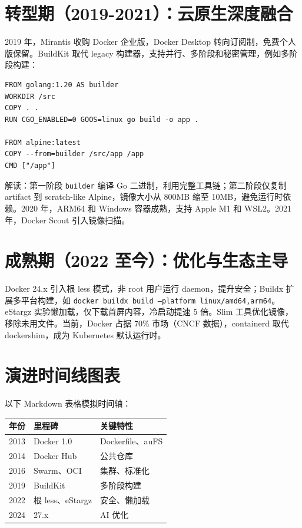 \section{转型期（2019-2021）：云原生深度融合}
2019 年，Mirantis 收购 Docker 企业版，Docker Desktop 转向订阅制，免费个人版保留。BuildKit 取代 legacy 构建器，支持并行、多阶段和秘密管理，例如多阶段构建：\par
\begin{lstlisting}
FROM golang:1.20 AS builder
WORKDIR /src
COPY . .
RUN CGO_ENABLED=0 GOOS=linux go build -o app .

FROM alpine:latest
COPY --from=builder /src/app /app
CMD ["/app"]
\end{lstlisting}
解读：第一阶段 \texttt{builder} 编译 Go 二进制，利用完整工具链；第二阶段仅复制 artifact 到 scratch-like Alpine，镜像大小从 800MB 缩至 10MB，避免运行时依赖。2020 年，ARM64 和 Windows 容器成熟，支持 Apple M1 和 WSL2。2021 年，Docker Scout 引入镜像扫描。\par
\section{成熟期（2022 至今）：优化与生态主导}
Docker 24.x 引入根 less 模式，非 root 用户运行 daemon，提升安全；Buildx 扩展多平台构建，如 \texttt{docker buildx build --platform linux/amd64,arm64}。eStargz 实验懒加载，仅下载首屏内容，冷启动提速 5 倍。Slim 工具优化镜像，移除未用文件。当前，Docker 占据 70\%{} 市场（CNCF 数据），containerd 取代 dockershim，成为 Kubernetes 默认运行时。\par
\section{演进时间线图表}
以下 Markdown 表格模拟时间轴：\par
\begin{table}[H]
\centering
\begin{tabular}{|l|l|l|}
\hline
年份 & 里程碑 & 关键特性 \\
\hline
2013 & Docker 1.0 & Dockerfile、auFS \\
\hline
2014 & Docker Hub & 公共仓库 \\
\hline
2016 & Swarm、OCI & 集群、标准化 \\
\hline
2019 & BuildKit & 多阶段构建 \\
\hline
2022 & 根 less、eStargz & 安全、懒加载 \\
\hline
2024 & 27.x & AI 优化 \\
\hline
\end{tabular}
\end{table}
